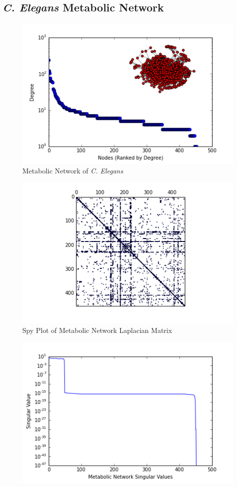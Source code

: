 \documentclass{article}
\begin{document}
\subsection{\textit{C. Elegans} Metabolic Network}
\begin{figure}[H]
\centering

\includegraphics[width=.8\linewidth]{meta_degree_histogram.png}
\caption{Metabolic Network of \textit{C. Elegans}}
  
\end{figure}
\begin{figure}[H]
\centering
\includegraphics[width = \linewidth]{metaspy.png}
\caption{Spy Plot of Metabolic Network Laplacian Matrix}
\end{figure}
\begin{figure}[H]
\centering
\includegraphics[width = .9\linewidth]{metasing.png}
\end{figure}
\end{document}
